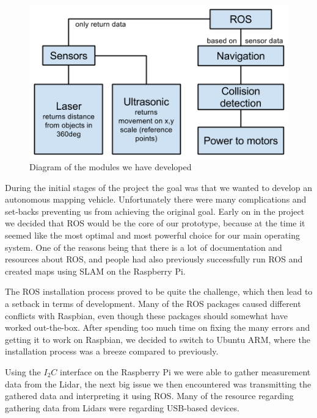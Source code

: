 \begin{figure}[H]
	\centering
	\includegraphics[scale=.5]{images/developmentdiagram2.png}
	\caption{Diagram of the modules we have developed}
	\label{fig:developmentdiagram2}
\end{figure}

During the initial stages of the project the goal was that we wanted to develop an autonomous mapping vehicle. Unfortunately there were many complications and set-backs preventing us from achieving the original goal. 
Early on in the project we decided that ROS would be the core of our prototype, because at the time it seemed like the most optimal and most powerful choice for our main operating system. One of the reasons being that there is a lot of documentation and resources about ROS, and people had also previously successfully run ROS and created maps using SLAM on the Raspberry Pi.

The ROS installation process proved to be quite the challenge, which then lead to a setback in terms of development. Many of the ROS packages caused different conflicts with Raspbian, even though these packages should somewhat have worked out-the-box. After spending too much time on fixing the many errors and getting it to work on Raspbian, we decided to switch to Ubuntu ARM, where the installation process was a breeze compared to previously.

Using the $I_2C$ interface on the Raspberry Pi we were able to gather measurement data from the Lidar, the next big issue we then encountered was transmitting the gathered data and interpreting it using ROS. Many of the resource regarding gathering data from Lidars were regarding USB-based devices. %


